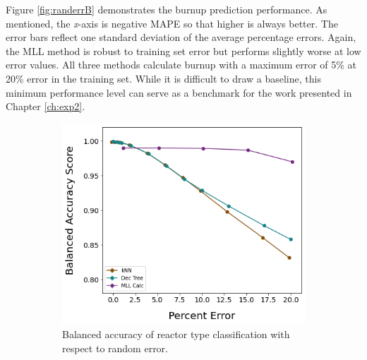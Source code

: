 
Figure \ref{fig:randerrB} demonstrates the burnup prediction performance.  As
mentioned, the \textit{x}-axis is negative \gls{MAPE} so that higher is always
better.  The error bars reflect one standard deviation of the average
percentage errors.  Again, the \gls{MLL} method is robust to training set error
but performs slightly worse at low error values.  All three methods calculate
burnup with a maximum error of 5\% at 20\% error in the training set.  While it
is difficult to draw a baseline, this minimum performance level can serve as a
benchmark for the work presented in Chapter \ref{ch:exp2}. 

\begin{figure}[!hbt]
  \centering
  \begin{subfigure}[b]{0.49\textwidth}
    \centering
    \includegraphics[width=\textwidth]{./chapters/exp1/randerr_compare_nuc29_BalAcc_rxtr.png}
    \caption{Balanced accuracy of reactor type classification with respect 
             to random error.}
    \label{fig:randerrA}
  \end{subfigure}
  \hfill
  \begin{subfigure}[b]{0.49\textwidth}
    \centering

\end{subfigure}
\end{figure}
